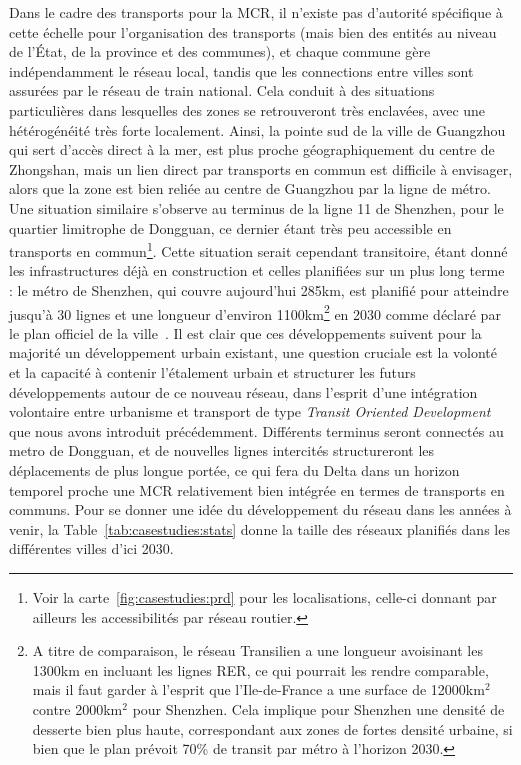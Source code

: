 {}{
Dans le cadre des transports pour la MCR, il n'existe pas d'autorité spécifique à cette échelle pour l'organisation des transports (mais bien des entités au niveau de l'État, de la province et des communes), et chaque commune gère indépendamment le réseau local, tandis que les connections entre villes sont assurées par le réseau de train national. Cela conduit à des situations particulières dans lesquelles des zones se retrouveront très enclavées, avec une hétérogénéité très forte localement. Ainsi, la pointe sud de la ville de Guangzhou qui sert d'accès direct à la mer, est plus proche géographiquement du centre de Zhongshan, mais un lien direct par transports en commun est difficile à envisager, alors que la zone est bien reliée au centre de Guangzhou par la ligne de métro. Une situation similaire s'observe au terminus de la ligne 11 de Shenzhen, pour le quartier limitrophe de Dongguan, ce dernier étant très peu accessible en transports en commun\footnote{Voir la carte~\ref{fig:casestudies:prd} pour les localisations, celle-ci donnant par ailleurs les accessibilités par réseau routier.}. Cette situation serait cependant transitoire, étant donné les infrastructures déjà en construction et celles planifiées sur un plus long terme : le métro de Shenzhen, qui couvre aujourd'hui 285km, est planifié pour atteindre jusqu'à 30 lignes et une longueur d'environ 1100km\footnote{A titre de comparaison, le réseau Transilien a une longueur avoisinant les 1300km en incluant les lignes RER, ce qui pourrait les rendre comparable, mais il faut garder à l'esprit que l'Ile-de-France a une surface de 12000km$^2$ contre 2000km$^2$ pour Shenzhen. Cela implique pour Shenzhen une densité de desserte bien plus haute, correspondant aux zones de fortes densité urbaine, si bien que le plan prévoit 70\% de transit par métro à l'horizon 2030.} en 2030 comme déclaré par le plan officiel de la ville~\cite{shenzhen2016plan}. Il est clair que ces développements suivent pour la majorité un développement urbain existant, une question cruciale est la volonté et la capacité à contenir l'étalement urbain et structurer les futurs développements autour de ce nouveau réseau, dans l'esprit d'une intégration volontaire entre urbanisme et transport de type \emph{Transit Oriented Development} que nous avons introduit précédemment. Différents terminus seront connectés au metro de Dongguan, et de nouvelles lignes intercités structureront les déplacements de plus longue portée, ce qui fera du Delta dans un horizon temporel proche une MCR relativement bien intégrée en termes de transports en communs. Pour se donner une idée du développement du réseau dans les années à venir, la Table~\ref{tab:casestudies:stats} donne la taille des réseaux planifiés dans les différentes villes d'ici 2030.
}

